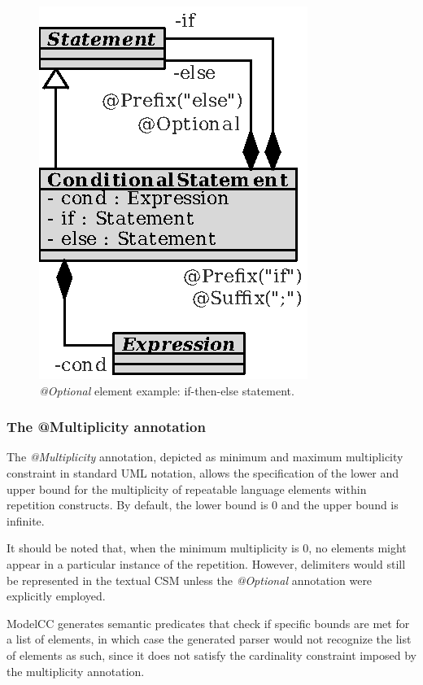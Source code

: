 \documentclass[a4paper,twoside,onecolumn]{article}
\newcommand{\an}[1]{\emph{#1}} %
\begin{document}
\begin{figure}[tb!]
\centering
\includegraphics[scale=1]{conditional2.eps}
\caption{\an{@Optional} element example: if-then-else statement.} \label{fig:conditional2}
\end{figure}

\subsubsection{The @Multiplicity annotation}

The \an{@Multiplicity} annotation, depicted as minimum and maximum multiplicity constraint in standard UML notation, allows the specification of the lower and upper bound for the multiplicity of repeatable language elements within repetition constructs.
By default, the lower bound is $0$ and the upper bound is infinite.

It should be noted that, when the minimum multiplicity is $0$, no elements might appear in a particular instance of the repetition.
However, delimiters would still be represented in the textual CSM unless the \an{@Optional} annotation were explicitly employed.

ModelCC generates semantic predicates that check if specific bounds are met for a list of elements, in which case the generated parser would not recognize the list of elements as such, since it does not satisfy the cardinality constraint imposed by the multiplicity annotation.
\end{document}
